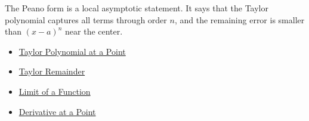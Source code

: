 \begin{remark*}[Interpretation]
The Peano form is a local asymptotic statement. It says that the Taylor
polynomial captures all terms through order $n$, and the remaining error is
smaller than $(x-a)^n$ near the center.
\end{remark*}

\begin{dependencies}
\begin{itemize}
  \item \hyperref[def:taylor-polynomial-at-a-point]{Taylor Polynomial at a Point}
  \item \hyperref[def:taylor-remainder]{Taylor Remainder}
  \item \hyperref[def:limit-function]{Limit of a Function}
  \item \hyperref[def:derivative-at-a-point]{Derivative at a Point}
\end{itemize}
\end{dependencies}